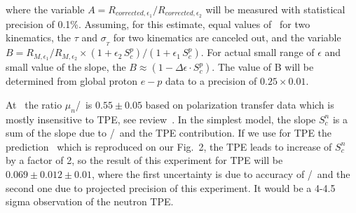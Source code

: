 where the variable $A = R_{{corrected},\epsilon_1}/R_{{corrected},\epsilon_2}$ will be measured with statistical precision of 0.1\%.  
Assuming, for this estimate, equal values of \qsq~for two kinematics, the  $\tau$ and $\sigma_{_T}$ for two kinematics are canceled out, and the variable
\mbox{$ B = {R_{M,\epsilon_1}}/{R_{M,\epsilon_2}} \times (1+ \epsilon_2 \, S_c^p)/( 1 + \epsilon_1 \, S_c^p)$}.
For actual small range of $\epsilon$ and small value of the slope, the $B \approx (1 - \Delta \epsilon \cdot S_c^p)$.
The value of B will be determined from global proton $e-p$ data to a precision of $0.25 \times 0.01$.
 
At  \gevcsq~the ratio $\mu_n$\gen/\gmn~is $0.55 \pm 0.05$ based on polarization transfer data which is mostly insensitive to TPE, see review~\cite{Punjabi:2015bba}.
%
In the simplest model, the slope $S_c^n$ is a sum of the slope due to \gen/\gmn~and the TPE contribution.
If we use for TPE the prediction~\cite{Blunden:2005ew} which is reproduced on our Fig.~2, the TPE leads to increase of $S_c^n$ by a factor of 2,
so the result of this experiment for TPE will be $0.069 \pm 0.012 \pm 0.01$, where the first uncertainty is due to accuracy 
of \gen/\gmn~and the second one due to projected precision of this experiment. It would be a 4-4.5 sigma observation of the neutron TPE.
